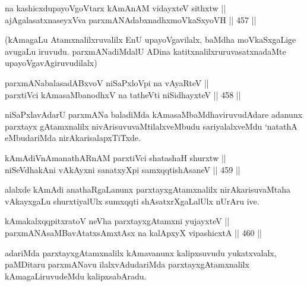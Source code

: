 \begin{shl}
na kashicxdupayoVgoV\s tarx kAmAnAM vidayxteV sithxtw || \\
ajAgalasatxnaseyxVva parxmANAdabxnadhxmoVkaSxyoVH \hfill || 457 ||  
\end{shl}

\begin{artha}
(kAmagaLu Atamxnalilxruvalilx EnU upayoVgavilalx, baMdha moVkaSxgaLige
avugaLu iruvudu. parxmANadiMdalU ADina katitxnalilxruruvasatxnadaMte upayoVgavAgiruvudilalx)
\end{artha}

\begin{shl}
parxmANabalasadABxvoV niSaPxloV\s pi na vAyaRteV || \\
parxtiVci kAmasaMbanodhxV na tatheVti niSidhayxteV \hfill || 458 ||  
\end{shl}

\begin{artha}
niSaPxlavAdarU parxmANa baladiMda kAmasaMbaMdhaviruvudAdare adanunx
parxtayx gAtamxnalilx nivArisuvuvaMtilalxveMbudu sariyalalxveMdu
`natathA eMbudariMda nirAkarisalapxTiTxde.
\end{artha}


\begin{shl}
kAmAdiVnAmanathARnAM parxtiVci shatashaH shurxtw || \\
niSeVdhakAni vAkAyxni sanatxyXpi samxqqtishAsaneV \hfill || 459 ||  
\end{shl}

\begin{artha}
alalxde kAmAdi anathaRgaLanunx parxtayxgAtamxnalilx nirAkarisuvaMtaha
vAkayxgaLu shurxtiyalUlx sumxqqti shAsatxrXgaLalUlx nUrAru ive.
\end{artha}



\begin{shl}
kAmakalxqqpitxratoV neVha parxtayxgAtamxni yujayxteV || \\
parxmANAsaMBavAtatxsAmxtAsx na kalApxyX vipashicxtA \hfill || 460 ||  
\end{shl}

\begin{artha}
adariMda parxtayxgAtamxnalilx kAmavanunx kalipxsuvudu yukatxvalalx,
paMDitaru parxmANavu ilalxvAdudariMda parxtayxgAtamxnalilx
kAmagaLiruvudeMdu kalipxsabAradu.
\end{artha}

